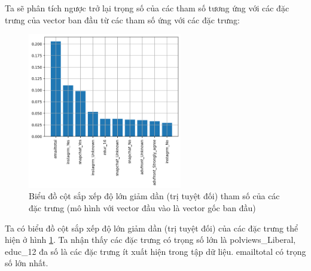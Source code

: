 \begin{enumerate}[label=(\alph*)]
    Ta sẽ phân tích ngược trở lại trọng số của các tham số tương ứng với các đặc trưng của vector ban đầu từ các tham số ứng với các đặc trưng:

    \begin{figure}[H]
        \centering
        \includegraphics[width=0.6\textwidth]{figures/Thanh/Models/Random_Forest/Non_null_models_Feature_Importance_Random_Forest_original_features.png}
        \caption{Biểu đồ cột sắp xếp độ lớn giảm dần (trị tuyệt đối) tham số của các đặc trưng (mô hình với vector đầu vào là vector gốc ban đầu)}
        \label{fig:Non_null_models_Feature_Importance_Random_Forest_original_features}
    \end{figure}

    Ta có biểu đồ cột sắp xếp độ lớn giảm dần (trị tuyệt đối) của các đặc trưng thể hiện ở hình \ref{fig:Non_null_models_Feature_Importance_Random_Forest_original_features}.
    Ta nhận thấy các đặc trưng có trọng số lớn là polviews\_Liberal, educ\_12 đa số là các đặc trưng ít xuất hiện trong tập dữ liệu.
    emailtotal có trọng số lớn nhất.
\end{enumerate}